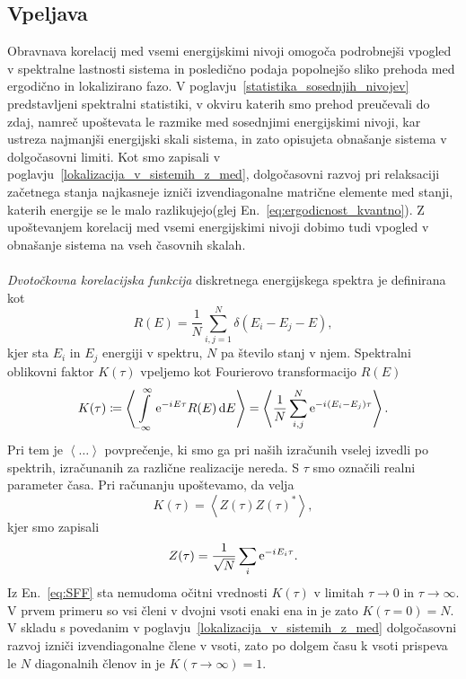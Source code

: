 \subsection{Vpeljava}
Obravnava korelacij med vsemi energijskimi nivoji omogoča podrobnejši vpogled v spektralne lastnosti sistema in posledično podaja popolnejšo sliko prehoda med ergodično in lokalizirano fazo. V poglavju~\ref{statistika_sosednjih_nivojev} predstavljeni spektralni statistiki, v okviru katerih smo prehod preučevali do zdaj, namreč upoštevata le razmike med sosednjimi energijskimi nivoji, kar ustreza najmanjši energijski skali sistema, in zato opisujeta obnašanje sistema v dolgočasovni limiti. Kot smo zapisali v poglavju~\ref{lokalizacija_v_sistemih_z_med}, dolgočasovni razvoj pri relaksaciji začetnega stanja najkasneje izniči izvendiagonalne matrične elemente med stanji, katerih energije se le malo razlikujejo(glej En.~\eqref{eq:ergodicnost_kvantno}). Z upoštevanjem korelacij med vsemi energijskimi nivoji dobimo tudi vpogled v obnašanje sistema na vseh časovnih skalah. \\\\
\emph{Dvotočkovna korelacijska funkcija} diskretnega energijskega spektra je definirana kot 
\begin{equation}\label{eq:engy_correlation}
R(E)=\frac{1}{N}\sum\limits_{i,j=1}^N\delta\left(E_i - E_j - E\right),
\end{equation}
kjer sta $E_i$ in $E_j$ energiji v spektru, $N$ pa število stanj v njem. Spektralni oblikovni faktor $K(\tau)$ vpeljemo kot Fourierovo transformacijo $R(E)$~\cite{chen2017universal}
\begin{equation}\label{eq:SFF}
K(\tau)\coloneqq \left\langle\int\limits_{-\infty}^\infty  \mathrm{e}^{-{i\mkern1mu} E \tau}R(E)\,\mathrm{d} E \right\rangle = \left\langle \frac{1}{N}\sum\limits_{i,j}^N \mathrm{e}^{-{i\mkern1mu} \left(E_i - E_j\right) \tau}\right\rangle.
\end{equation}
Pri tem je $\left\langle\dots\right\rangle$ povprečenje, ki smo ga pri naših izračunih vselej izvedli po spektrih, izračunanih za različne realizacije nereda. S $\tau$ smo označili realni parameter časa. Pri računanju upoštevamo, da velja
\begin{equation}
K(\tau)=\left\langle Z(\tau)Z(\tau)^* \right\rangle,
\end{equation}
kjer smo zapisali
\begin{equation}
Z(\tau)=\frac{1}{\sqrt{N}}\sum\limits_i \mathrm{e}^{-{i\mkern1mu} E_i \tau}.
\end{equation}
Iz En.~\eqref{eq:SFF} sta nemudoma očitni vrednosti $K(\tau)$ v limitah $\tau\to0$ in $\tau\to\infty$. V prvem primeru so vsi členi v dvojni vsoti enaki ena in je zato $K(\tau=0)=N.$ V skladu s povedanim v poglavju~\ref{lokalizacija_v_sistemih_z_med} dolgočasovni razvoj izniči izvendiagonalne člene v vsoti, zato po dolgem času k vsoti prispeva le $N$ diagonalnih členov in je $K(\tau\to\infty)=1.$\\\\
